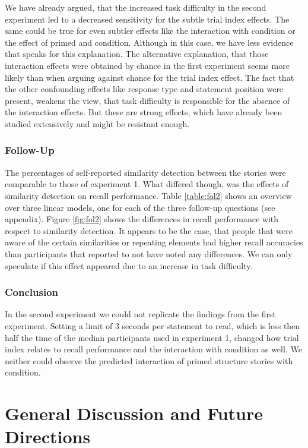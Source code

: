 \documentclass[a4paper,man,natbib,floatsintext,import]{apa6}
\begin{document}
We have already argued, that the increased task difficulty in the second experiment led to a decreased sensitivity for the subtle trial index effects. The same could be true for even subtler effects like the interaction with condition or the effect of primed and condition. Although in this case, we have less evidence that speaks for this explanation. The alternative explanation, that those interaction effects were obtained by chance in the first experiment seems more likely than when arguing against chance for the trial index effect. The fact that the other confounding effects like response type and statement position were present, weakens the view, that task difficulty is responsible for the absence of the interaction effects. But these are strong effects, which have already been studied extensively and might be resistant enough.



\subsubsection{Follow-Up}
The percentages of self-reported similarity detection between the stories were comparable to those of experiment 1. What differed though, was the effects of similarity detection on recall performance. Table \ref{table:fol2} shows an overview over three linear models, one for each of the three follow-up questions (see appendix). Figure \ref{fig:fol2} shows the differences in recall performance with respect to similarity detection. It appears to be the case, that people that were aware of the certain similarities or repeating elements had higher recall accuracies than participants that reported to not have noted any differences. We can only speculate if this effect appeared due to an increase in task difficulty.

\subsubsection{Conclusion}
In the second experiment we could not replicate the findings from the first experiment. Setting a limit of 3 seconds per statement to read, which is less then half the time of the median participants used in experiment 1, changed how trial index relates to recall performance and the interaction with condition as well. We neither could observe the predicted interaction of primed structure stories with condition.

\newpage
\section{General Discussion and Future Directions}
\end{document}
